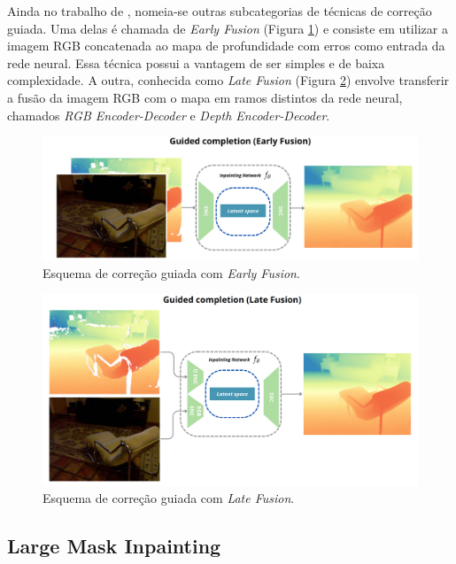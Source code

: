 Ainda no trabalho de \cite{hu2022deep}, nomeia-se outras subcategorias de técnicas de correção guiada. Uma delas é chamada de \textit{Early Fusion} (Figura \ref{early}) e consiste em utilizar a imagem RGB concatenada ao mapa de profundidade com erros como entrada da rede neural. Essa técnica possui a vantagem de ser simples e de baixa complexidade. A outra, conhecida como \textit{Late Fusion} (Figura \ref{late}) envolve transferir a fusão da imagem RGB com o mapa em ramos distintos da rede neural, chamados \textit{RGB Encoder-Decoder} e \textit{Depth Encoder-Decoder}.

\begin{figure}[h]
    \centering
    \includegraphics[width=\textwidth]{fig/earlyfusion.png}
    \caption{Esquema de correção guiada com \textit{Early Fusion}.}
    \label{early}
\end{figure}

\begin{figure}[h]
    \centering
    \includegraphics[width=\textwidth]{fig/latefusion.png}
    \caption{Esquema de correção guiada com \textit{Late Fusion}.}
    \label{late}
\end{figure}


\subsection{Large Mask Inpainting}


